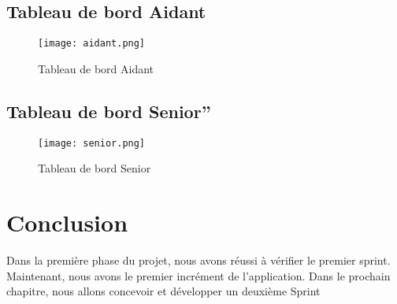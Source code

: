 \documentclass[12pt,a4paper]{report}
\begin{document}
\subsection{Tableau de bord Aidant}
\begin{figure}[H] 
    \centering
    \texttt{[image: aidant.png]}
    \caption{Tableau de bord Aidant  }
    \label{fig:aidant}
\end{figure}
\subsection{Tableau de bord Senior”}
\begin{figure}[H] 
    \centering
    \texttt{[image: senior.png]}
    \caption{Tableau de bord Senior }
    \label{fig:senior}
\end{figure}
\section{Conclusion}
Dans la première phase du projet, nous avons réussi à vérifier le premier sprint. Maintenant, nous avons le premier incrément de l'application. Dans le prochain chapitre, nous allons concevoir et développer un deuxième Sprint 
\end{document}
